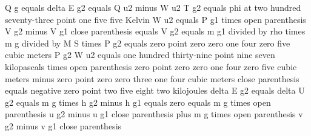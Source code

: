 Q g equals delta E g2 equals Q u2 minus W u2  
T g2 equals phi at two hundred seventy-three point one five five Kelvin  
W u2 equals P g1 times open parenthesis V g2 minus V g1 close parenthesis equals  
V g2 equals m g1 divided by rho times m g divided by M S times P g2 equals zero point zero zero one four zero five cubic meters  
P g2  
W u2 equals one hundred thirty-nine point nine seven kilopascals times open parenthesis zero point zero zero one four zero five cubic meters minus zero point zero zero three one four cubic meters close parenthesis equals negative zero point two five eight two kilojoules  
delta E g2 equals delta U g2 equals m g times h g2 minus h g1 equals zero equals m g times open parenthesis u g2 minus u g1 close parenthesis plus m g times open parenthesis v g2 minus v g1 close parenthesis